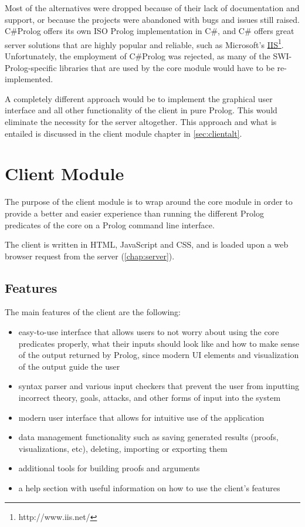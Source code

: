 \documentclass[11pt,twoside,a4paper]{report}
\begin{document}
Most of the alternatives were dropped because of their lack of documentation and support, or because the projects were abandoned with bugs and issues still raised. C\#Prolog offers its own ISO Prolog implementation in C\#, and C\# offers great server solutions that are highly popular and reliable, such as Microsoft's \href{http://www.iis.net/}{IIS}\footnote{http://www.iis.net/}. Unfortunately, the employment of C\#Prolog was rejected, as many of the SWI-Prolog-specific libraries that are used by the core module would have to be re-implemented.

A completely different approach would be to implement the graphical user interface and all other functionality of the client in pure Prolog. This would eliminate the necessity for the server altogether. This approach and what is entailed is discussed in the client module chapter in \autoref{sec:clientalt}.

\chapter{Client Module}
\label{chap:client}
The purpose of the client module is to wrap around the core module in order to provide a better and easier experience than running the different Prolog predicates of the core on a Prolog command line interface.

The client is written in HTML, JavaScript and CSS, and is loaded upon a web browser request from the server (\autoref{chap:server}).

\section{Features}
\label{sec:cleatures}
The main features of the client are the following:
\begin{itemize}
\item
easy-to-use interface that allows users to not worry about using the core predicates properly, what their inputs should look like and how to make sense of the output returned by Prolog, since modern UI elements and visualization of the output guide the user
\item
syntax parser and various input checkers that prevent the user from inputting incorrect theory, goals, attacks, and other forms of input into the system
\item
modern user interface that allows for intuitive use of the application
\item
data management functionality such as saving generated results (proofs, visualizations, etc), deleting, importing or exporting them
\item
additional tools for building proofs and arguments
\item
a help section with useful information on how to use the client's features
\end{itemize}
\end{document}
